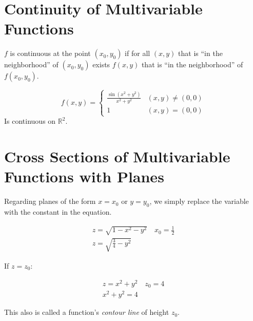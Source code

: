 \documentclass[00_complete]{subfiles}
\begin{document}
\section{Continuity of Multivariable Functions}
\begin{definition}
    $f$ is continuous at the point $(x_0,y_0)$ if for all $(x,y)$ that is ``in
    the neighborhood'' of $(x_0,y_0)$ exists $f(x,y)$ that is ``in the
    neighborhood'' of $f(x_0,y_0)$.
    \begin{example}
        $$f(x,y)=\begin{cases}
            \frac{\sin(x^2+y^2)}{x^2+y^2} &(x,y) \neq (0,0) \\
            1 & (x,y)=(0,0)
        \end{cases}$$
        Is continuous on $\mathbb{R}^2$.
    \end{example}
\end{definition}
\section{Cross Sections of Multivariable Functions with Planes}
Regarding planes of the form $x=x_0$ or $y=y_0$, we simply replace
the variable with the constant in the equation.
\begin{example}
    \begin{gather*}
        z=\sqrt{1-x^2-y^2} \quad x_0=\frac{1}{2} \\
        z = \sqrt{\frac{3}{4}-y^2}
    \end{gather*}
\end{example}
If $z=z_0$:
\begin{example}
    \begin{gather*}
        z=x^2+y^2 \quad z_0=4 \\
        x^2+y^2=4
    \end{gather*}
\end{example}
This also is called a function's \emph{contour line} of height $z_0$.
\end{document}
